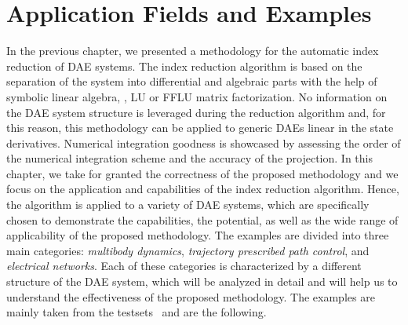 
\chapter{Application Fields and Examples}
\label{chap4:applications}

In the previous chapter, we presented a methodology for the automatic index reduction of \ac{DAE} systems. The index reduction algorithm is based on the separation of the system into differential and algebraic parts with the help of symbolic linear algebra, \ie{}, \ac{LU} or \ac{FFLU} matrix factorization. No information on the \ac{DAE} system structure is leveraged during the reduction algorithm and, for this reason, this methodology can be applied to generic \acp{DAE} linear in the state derivatives. Numerical integration goodness is showcased by assessing the order of the numerical integration scheme and the accuracy of the projection. In this chapter, we take for granted the correctness of the proposed methodology and we focus on the application and capabilities of the index reduction algorithm. Hence, the algorithm is applied to a variety of \ac{DAE} systems, which are specifically chosen to demonstrate the capabilities, the potential, as well as the wide range of applicability of the proposed methodology. The examples are divided into three main categories: \emph{multibody dynamics}, \emph{trajectory prescribed path control}, and \emph{electrical networks}. Each of these categories is characterized by a different structure of the \ac{DAE} system, which will be analyzed in detail and will help us to understand the effectiveness of the proposed methodology. The examples are mainly taken from the testsets~\cite{lioen1998test, mazzia2003test, mazzia2008test, mazzia2012test} and are the following.
%
